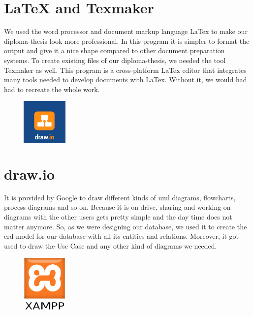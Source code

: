 \section{LaTeX and Texmaker}
We used the word processor and document markup language LaTex to make our diploma-thesis look more professional. In this program it is simpler to format the output and give it a nice shape compared to other document preparation systems. To create existing files of our diploma-thesis, we needed the tool Texmaker as well. This program is a cross-platform LaTex editor that integrates many tools needed to develop documents with LaTex. Without it, we would had had to recreate the whole work.

\begin{figure}
  \begin{center}
    \includegraphics[width=0.2\textwidth] {bilder/Draw_io}
  \end{center}
\end{figure}
\section{draw.io}
It is provided by Google to draw different kinds of \gls{uml} diagrams, flowcharts, process diagrams and so on. Because it is on drive, sharing and working on diagrams with the other users gets pretty simple and the day time does not matter anymore. So, as we were designing our database, we used it to create the \gls{erd} model for our database with all its entities and relations. Moreover, it got used to draw the Use Case and any other kind of diagrams we needed.

\begin{figure}
  \begin{center}
    \includegraphics[width=0.2\textwidth] {bilder/XAMPP}
  \end{center}
\end{figure}
